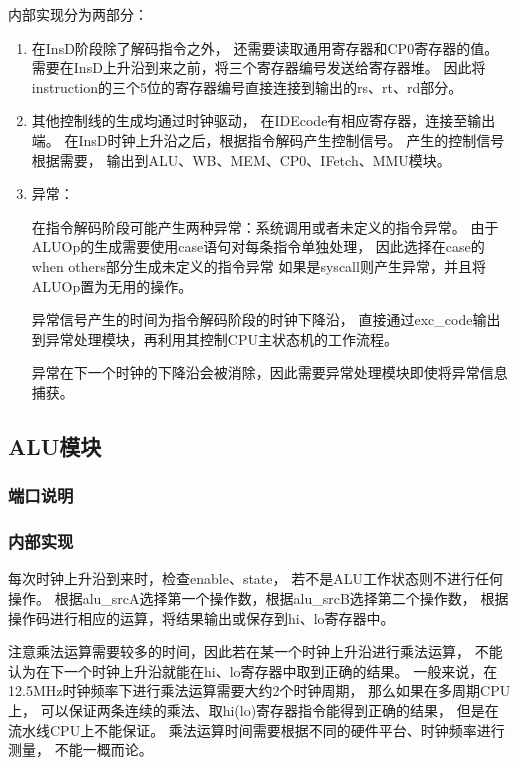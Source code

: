             内部实现分为两部分：%
            \begin{enumerate}
            \item
            在InsD阶段除了解码指令之外，%
            还需要读取通用寄存器和CP0寄存器的值。%
            需要在InsD上升沿到来之前，将三个寄存器编号发送给寄存器堆。%
            因此将instruction的三个5位的寄存器编号直接连接到输出的rs、rt、rd部分。%
            \item
            其他控制线的生成均通过时钟驱动，%
            在IDEcode有相应寄存器，连接至输出端。%
            在InsD时钟上升沿之后，根据指令解码产生控制信号。%
            产生的控制信号根据需要，%
            输出到ALU、WB、MEM、CP0、IFetch、MMU模块。
            \item
            异常：

            在指令解码阶段可能产生两种异常：系统调用或者未定义的指令异常。%
            由于ALUOp的生成需要使用case语句对每条指令单独处理，%
            因此选择在case的when others部分生成未定义的指令异常%
            如果是syscall则产生异常，并且将ALUOp置为无用的操作。%

            异常信号产生的时间为指令解码阶段的时钟下降沿，%
            直接通过exc\_code输出到异常处理模块，再利用其控制CPU主状态机的工作流程。

            异常在下一个时钟的下降沿会被消除，因此需要异常处理模块即使将异常信息捕获。

            \end{enumerate}

    \subsection{ALU模块}
        \subsubsection{端口说明}
            
        \subsubsection{内部实现}
            每次时钟上升沿到来时，检查enable、state，%
            若不是ALU工作状态则不进行任何操作。%
            根据alu\_srcA选择第一个操作数，根据alu\_srcB选择第二个操作数，%
            根据操作码进行相应的运算，将结果输出或保存到hi、lo寄存器中。

            注意乘法运算需要较多的时间，因此若在某一个时钟上升沿进行乘法运算，%
            不能认为在下一个时钟上升沿就能在hi、lo寄存器中取到正确的结果。%
            一般来说，在12.5MHz时钟频率下进行乘法运算需要大约2个时钟周期，%
            那么如果在多周期CPU上，%
            可以保证两条连续的乘法、取hi(lo)寄存器指令能得到正确的结果，%
            但是在流水线CPU上不能保证。%
            乘法运算时间需要根据不同的硬件平台、时钟频率进行测量，%
            不能一概而论。
